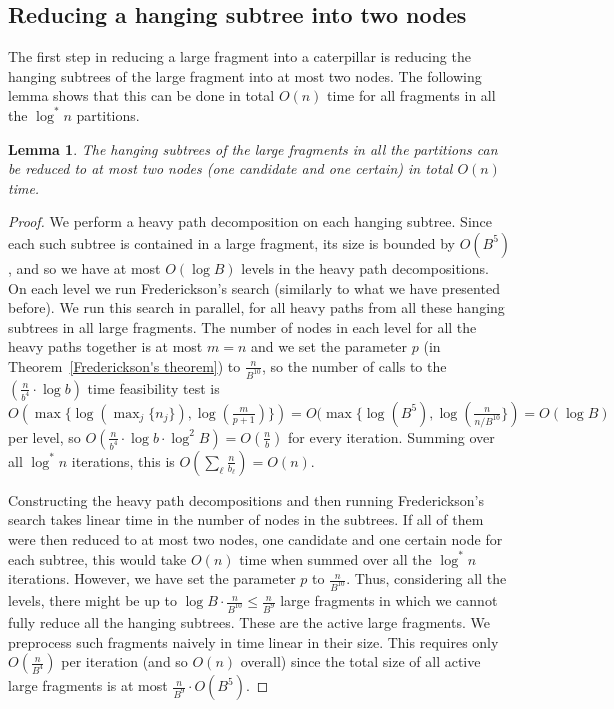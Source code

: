 \documentclass[11pt,a4paper]{article}
\newtheorem{lemma}{Lemma}
\theoremstyle{definition}
\theoremstyle{remark}
\begin{document}
\subsection{Reducing a hanging subtree into two nodes}\label{section:lemma1}
The first step in reducing a large fragment into a caterpillar is reducing the hanging subtrees of the large fragment into at most two nodes. The following lemma shows that this can be done in total $O(n)$ time for all fragments in all the $\log^* n$ partitions.




\begin{lemma}\label{lemma1}
	The hanging subtrees of the large fragments in all the partitions can be reduced to at most two nodes (one candidate and one certain) in total $O(n)$ time. 
\end{lemma}
\begin{proof}
We 
perform a heavy path decomposition on each hanging subtree. Since each such subtree is contained in a large fragment, its 
size is bounded by $O(B^5)$, and so we have at most $O(\log B)$ levels in the heavy 
path decompositions. On each level we run Frederickson's search (similarly to what we have presented before).
We run this search in parallel, for all heavy paths from all these hanging subtrees in all large fragments.
The number of  nodes in each level for all the heavy paths together is at most $m=n$ and we set
the parameter $p$ (in Theorem~\ref{Frederickson's theorem}) to $\frac{n}{B^{10}}$, so the number of calls to the $(\frac{n}{b^4} \cdot \log b)$ time feasibility test
is $O(\max \lbrace \log(\max_{j} \lbrace n_j \rbrace), \log(\frac{m}{p+1}) \rbrace) = O(\max \lbrace \log (B^{5}), \log(\frac{n}{n/B^{10}} \rbrace) = O(\log B)$ per level, so
$O(\frac{n}{b^4} \cdot \log b \cdot \log^{2} B) = O(\frac{n}{b})$ for every iteration.
Summing over all $\log^{*}n$ iterations, this is $O(\sum_{\ell}\frac{n}{b_\ell}) = O(n)$.

Constructing the heavy path decompositions and then running Frederickson's search takes linear time in the number
of nodes in the subtrees. If all of them were then reduced to at most two nodes, one candidate and one certain
node for each subtree, this would take $O(n)$ time when summed over all the $\log^{*}n$  iterations. However, we have set
the parameter $p$ to $\frac{n}{B^{10}}$. Thus, considering all the levels, there
might be up to $\log B\cdot\frac{n}{B^{10}}\leq \frac{n}{B^{9}}$ large fragments in which we cannot fully reduce
all the hanging subtrees. These are the active large fragments. We preprocess such fragments naively in time linear in their size. 
This requires only $O(\frac{n}{B^{4}})$ per iteration (and so $O(n)$ overall) since the total size of all active large fragments is at most
$\frac{n}{B^9} \cdot O(B^5)$. 
\end{proof}
\end{document}
